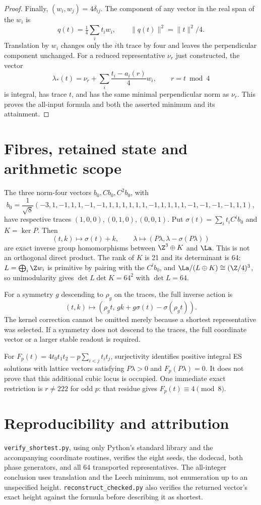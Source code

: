 \begin{proof}
Finally, $(w_i,w_j)=4\delta_{ij}$. The component of any vector in the real span of the $w_i$ is
\[
q(t)=\tfrac14\sum_i t_iw_i,\qquad\|q(t)\|^2=\|t\|^2/4.
\]
Translation by $w_i$ changes only the $i$th trace by four and leaves the perpendicular component unchanged. For a reduced representative $\nu_r$ just constructed, the vector
\[
\boxed{\lambda_*(t)=\nu_r+\sum_i\frac{t_i-a_i(r)}4w_i,\qquad r=t\bmod4}
\]
is integral, has trace $t$, and has the same minimal perpendicular norm as $\nu_r$. This proves the all-input formula and both the asserted minimum and its attainment.
\end{proof}

\section{Fibres, retained state and arithmetic scope}
The three norm-four vectors $b_0,Cb_0,C^2b_0$, with
\[
b_0=\frac1{\sqrt8}(-3,1,-1,1,1,-1,-1,1,1,1,1,1,1,-1,1,1,1,1,-1,-1,-1,-1,1,1),
\]
have respective traces $(1,0,0),(0,1,0),(0,0,1)$. Put $\sigma(t)=\sum_i t_iC^ib_0$ and $K=\ker P$. Then
\[
(t,k)\longmapsto\sigma(t)+k,\qquad
\lambda\longmapsto(P\lambda,\lambda-\sigma(P\lambda))
\]
are exact inverse group homomorphisms between $\Z^3\oplus K$ and $\La$. This is not an orthogonal direct product. The rank of $K$ is 21 and its determinant is 64: $L=\bigoplus_i\Z w_i$ is primitive by pairing with the $C^ib_0$, and $\La/(L\oplus K)\cong(\Z/4)^3$, so unimodularity gives $\det L\det K=64^2$ with $\det L=64$.

For a symmetry $g$ descending to $\rho_g$ on the traces, the full inverse action is
\[
(t,k)\longmapsto(\rho_gt,\,gk+g\sigma(t)-\sigma(\rho_gt)).
\]
The kernel correction cannot be omitted merely because a shortest representative was selected. If a symmetry does not descend to the traces, the full coordinate vector or a larger stable readout is required.

For $F_p(t)=4t_0t_1t_2-p\sum_{i<j}t_it_j$, surjectivity identifies positive integral ES solutions with lattice vectors satisfying $P\lambda>0$ and $F_p(P\lambda)=0$. It does not prove that this additional cubic locus is occupied. One immediate exact restriction is $r\ne222$ for odd $p$: that residue gives $F_p(t)\equiv4\pmod8$.

\section{Reproducibility and attribution}
\texttt{verify\_shortest.py}, using only Python's standard library and the accompanying coordinate routines, verifies the eight seeds, the dodecad, both phase generators, and all 64 transported representatives. The all-integer conclusion uses translation and the Leech minimum, not enumeration up to an unspecified height. \texttt{reconstruct\_checked.py} also verifies the returned vector's exact height against the formula before describing it as shortest.

